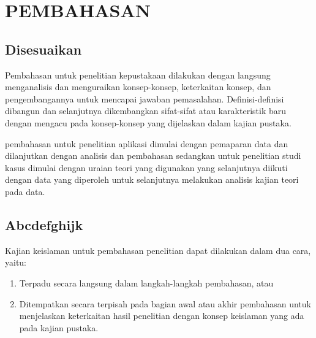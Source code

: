 \chapter{PEMBAHASAN}
\section{Disesuaikan}
Pembahasan untuk penelitian kepustakaan dilakukan dengan langsung menganalisis dan menguraikan konsep-konsep, keterkaitan konsep, dan pengembangannya untuk mencapai jawaban pemasalahan. Definisi-definisi dibangun dan selanjutnya dikembangkan sifat-sifat atau karakteristik baru dengan mengacu pada konsep-konsep yang dijelaskan dalam kajian pustaka.

 pembahasan untuk penelitian aplikasi dimulai dengan pemaparan data dan dilanjutkan dengan analisis dan pembahasan sedangkan untuk penelitian studi kasus dimulai dengan uraian teori yang digunakan yang selanjutnya diikuti dengan data yang diperoleh untuk selanjutnya melakukan analisis kajian teori pada data.
\section{Abcdefghijk}
Kajian keislaman untuk pembahasan penelitian dapat dilakukan dalam dua cara, yaitu:
\begin{enumerate}
\item Terpadu secara langsung dalam langkah-langkah pembahasan, atau
\item Ditempatkan secara terpisah pada bagian awal atau akhir pembahasan untuk menjelaskan keterkaitan hasil penelitian dengan konsep keislaman yang ada pada kajian pustaka.
\end{enumerate}